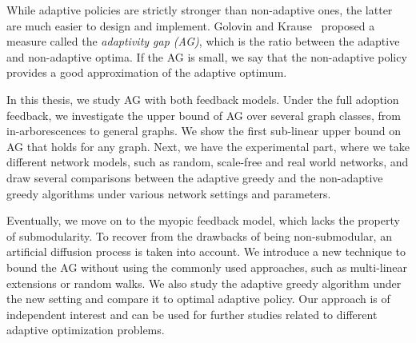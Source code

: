 \documentclass[11pt, a4paper, oneside]{Thesis} %
\begin{document}
While adaptive policies are strictly stronger than non-adaptive ones, the latter are much easier to design and implement. Golovin and Krause~\cite{Golovin2011a} proposed a measure called the \textit{adaptivity gap (AG)}, which is the ratio between the adaptive and non-adaptive optima. If the AG is small, we say that the non-adaptive policy provides a good approximation of the adaptive optimum.

In this thesis, we study AG with both feedback models. Under the full adoption feedback, we investigate the upper bound of AG over several graph classes, from in-arborescences to general graphs. We show the first sub-linear upper bound on AG that holds for any graph. 
Next, we have the experimental part, where we take different network models, such as random, scale-free and real world networks, and draw several comparisons between the adaptive greedy and the non-adaptive greedy algorithms under various network settings and parameters.

Eventually, we move on to the myopic feedback model, which lacks the property of submodularity. To recover from the drawbacks of being non-submodular, an artificial diffusion process is taken into account. We introduce a new technique to bound the AG without using the commonly used approaches, such as multi-linear extensions or random walks. We also study the adaptive greedy algorithm under the new setting and compare it to optimal adaptive policy. Our approach is of independent interest and can be used for further studies related to  different adaptive optimization problems.




\clearpage %


\end{document}

